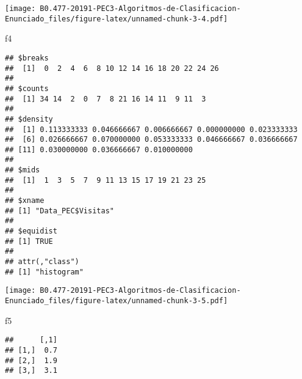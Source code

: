 \documentclass[]{article}
\newenvironment{Shaded}{\begin{snugshade}}{\end{snugshade}}
\newcommand{\KeywordTok}[1]{\textcolor[rgb]{0.94,0.87,0.69}{#1}}
\newcommand{\DataTypeTok}[1]{\textcolor[rgb]{0.87,0.87,0.75}{#1}}
\newcommand{\StringTok}[1]{\textcolor[rgb]{0.80,0.58,0.58}{#1}}
\newcommand{\CommentTok}[1]{\textcolor[rgb]{0.50,0.62,0.50}{#1}}
\newcommand{\OtherTok}[1]{\textcolor[rgb]{0.94,0.94,0.56}{#1}}
\newcommand{\OperatorTok}[1]{\textcolor[rgb]{0.94,0.94,0.82}{#1}}
\newcommand{\NormalTok}[1]{\textcolor[rgb]{0.80,0.80,0.80}{#1}}
\begin{document}
\begin{Shaded}
\end{Shaded}

\texttt{[image: B0.477-20191-PEC3-Algoritmos-de-Clasificacion-Enunciado\_files/figure-latex/unnamed-chunk-3-4.pdf]}

\begin{Shaded}
\begin{Highlighting}[]
\NormalTok{f4}
\end{Highlighting}
\end{Shaded}

\begin{verbatim}
## $breaks
##  [1]  0  2  4  6  8 10 12 14 16 18 20 22 24 26
## 
## $counts
##  [1] 34 14  2  0  7  8 21 16 14 11  9 11  3
## 
## $density
##  [1] 0.113333333 0.046666667 0.006666667 0.000000000 0.023333333
##  [6] 0.026666667 0.070000000 0.053333333 0.046666667 0.036666667
## [11] 0.030000000 0.036666667 0.010000000
## 
## $mids
##  [1]  1  3  5  7  9 11 13 15 17 19 21 23 25
## 
## $xname
## [1] "Data_PEC$Visitas"
## 
## $equidist
## [1] TRUE
## 
## attr(,"class")
## [1] "histogram"
\end{verbatim}

\begin{Shaded}
\end{Shaded}

\texttt{[image: B0.477-20191-PEC3-Algoritmos-de-Clasificacion-Enunciado\_files/figure-latex/unnamed-chunk-3-5.pdf]}

\begin{Shaded}
\begin{Highlighting}[]
\NormalTok{f5}
\end{Highlighting}
\end{Shaded}

\begin{verbatim}
##      [,1]
## [1,]  0.7
## [2,]  1.9
## [3,]  3.1
\end{verbatim}
\end{document}
